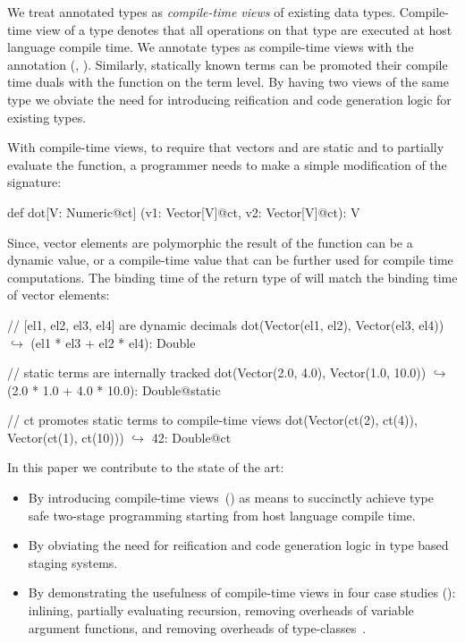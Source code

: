 We treat annotated types as \emph{compile-time views}
 of existing data types. Compile-time view of a type denotes that all operations on that type are
 executed at host language compile time. We annotate types as compile-time views
 with the  annotation (\eg, ). Similarly, statically known terms can be promoted
 their compile time duals with the  function on the term level.
 By having two views of the same type we obviate the need for introducing reification and code generation logic for
 existing types.

With compile-time views, to require that vectors  and  are
 static and to partially evaluate the function, a programmer needs to make
 a simple modification of the  signature:\begin{lstparagraph}
def dot[V: Numeric@ct]
  (v1: Vector[V]@ct, v2: Vector[V]@ct): V
\end{lstparagraph}

Since, vector elements are polymorphic the result
 of the function can be a dynamic value, or a compile-time value
 that can be further used for compile time computations. The binding time of the return type
 of  will match the binding time of vector elements:

\vspace{1.8mm}
\begin{listing}[mathescape]
  // [el1, el2, el3, el4] are dynamic decimals
  dot(Vector(el1, el2), Vector(el3, el4))
    $\hookrightarrow$ (el1 * el3 + el2 * el4): Double

  // static terms are internally tracked
  dot(Vector(2.0, 4.0), Vector(1.0, 10.0))
    $\hookrightarrow$ (2.0 * 1.0 + 4.0 * 10.0): Double@static

  // ct promotes static terms to compile-time views
  dot(Vector(ct(2), ct(4)),
      Vector(ct(1), ct(10)))
    $\hookrightarrow$ 42: Double@ct
\end{listing}
\vspace{1.8mm}

In this paper we contribute to the state of the art:
\begin{itemize}

 \item By introducing compile-time views~() as means to succinctly achieve
  type safe two-stage programming starting from host language compile time.

 \item By obviating the need for reification and code generation logic in type based staging systems.

 \item By demonstrating the usefulness of compile-time views in four case
  studies (): inlining, partially evaluating recursion,
  removing overheads of variable argument functions, and removing overheads of
  type-classes~\cite{wadler1989make,hall_type_1996,oliveira_type_2010}.

\end{itemize}

